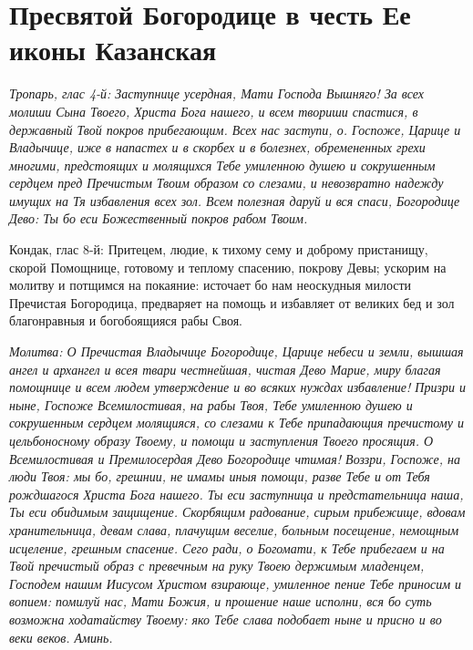 


 


 

\section{Пресвятой Богородице в честь Ее иконы Казанская}
 


\itshape Тропарь, глас 4-й:\normalfont{} Заступнице усердная, Мати Господа Вышняго! За всех молиши Сына Твоего, Христа Бога нашего, и всем твориши спастися, в державный Твой покров прибегающим. Всех нас заступи, о. Госпоже, Царице и Владычице, иже в напастех и в скорбех и в болезнех, обремененных грехи многими, предстоящих и молящихся Тебе умиленною душею и сокрушенным сердцем пред Пречистым Твоим образом со слезами, и невозвратно надежду имущих на Тя избавления всех зол. Всем полезная даруй и вся спаси, Богородице Дево: Ты бо еси Божественный покров рабом Твоим. 

\itshape 

Кондак, глас 8-й:\normalfont{} Притецем, людие, к тихому сему и доброму пристанищу, скорой Помощнице, готовому и теплому спасению, покрову Девы; ускорим на молитву и потщимся на покаяние: источает бо нам неоскудныя милости Пречистая Богородица, предваряет на помощь и избавляет от великих бед и зол благонравныя и богобоящияся рабы Своя. 

\itshape Молитва:\normalfont{} О Пречистая Владычице Богородице, Царице небеси и земли, вышшая ангел и архангел и всея твари честнейшая, чистая Дево Марие, миру благая помощнице и всем людем утверждение и во всяких нуждах избавление! Призри и ныне, Госпоже Всемилостивая, на рабы Твоя, Тебе умиленною душею и сокрушенным сердцем молящияся, со слезами к Тебе припадающия пречистому и цельбоносному образу Твоему, и помощи и заступления Твоего просящия. О Всемилостивая и Премилосердая Дево Богородице чтимая! Воззри, Госпоже, на люди Твоя: мы бо, грешнии, не имамы иныя помощи, разве Тебе и от Тебя рождшагося Христа Бога нашего. Ты еси заступница и предстательница наша, Ты еси обидимым защищение. Скорбящим радование, сирым прибежище, вдовам хранительница, девам слава, плачущим веселие, больным посещение, немощным исцеление, грешным спасение. Сего ради, о Богомати, к Тебе прибегаем и на Твой пречистый образ с превечным на руку Твоею держимым младенцем, Господем нашим Иисусом Христом взирающе, умиленное пение Тебе приносим и вопием: помилуй нас, Мати Божия, и прошение наше исполни, вся бо суть возможна ходатайству Твоему: яко Тебе слава подобает ныне и присно и во веки веков. Аминь.





